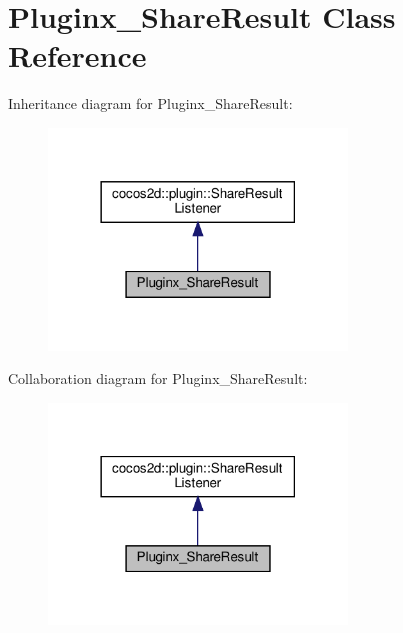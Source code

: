 \hypertarget{classPluginx__ShareResult}{}\section{Pluginx\+\_\+\+Share\+Result Class Reference}
\label{classPluginx__ShareResult}


Inheritance diagram for Pluginx\+\_\+\+Share\+Result\+:
\nopagebreak
\begin{figure}[H]
\begin{center}
\leavevmode
\includegraphics[width=225pt]{classPluginx__ShareResult__inherit__graph}
\end{center}
\end{figure}


Collaboration diagram for Pluginx\+\_\+\+Share\+Result\+:
\nopagebreak
\begin{figure}[H]
\begin{center}
\leavevmode
\includegraphics[width=225pt]{classPluginx__ShareResult__coll__graph}
\end{center}
\end{figure}
